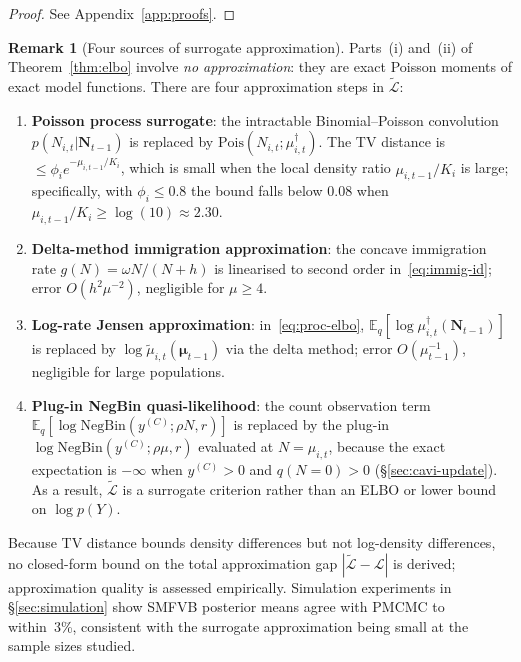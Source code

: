 \documentclass[review,12pt]{elsarticle}
\theoremstyle{definition}
\newtheorem{remark}{Remark}
\begin{document}
\begin{proof}
See Appendix~\ref{app:proofs}.
\end{proof}

\begin{remark}[Four sources of surrogate approximation]\label{rem:poi-approx}
Parts~(i) and~(ii) of Theorem~\ref{thm:elbo} involve \emph{no approximation}:
they are exact Poisson moments of exact model functions.  There are four
approximation steps in $\tilde{\mathcal{L}}$:
\begin{enumerate}[label=(\alph*)]
\item \textbf{Poisson process surrogate}: the intractable Binomial--Poisson
  convolution $p(N_{i,t}|\mathbf{N}_{t-1})$ is replaced by
  $\mathrm{Pois}(N_{i,t};\mu^\dagger_{i,t})$.  The TV distance is
  $\le\phi_i e^{-\mu_{i,t-1}/K_i}$, which is small when the local
  density ratio $\mu_{i,t-1}/K_i$ is large; specifically, with $\phi_i\le0.8$
  the bound falls below $0.08$ when $\mu_{i,t-1}/K_i\ge\log(10)\approx2.30$.
\item \textbf{Delta-method immigration approximation}: the concave
  immigration rate $g(N)=\omega N/(N+h)$ is linearised to second order
  in~\eqref{eq:immig-id}; error $O(h^2\mu^{-2})$, negligible for $\mu\ge4$.
\item \textbf{Log-rate Jensen approximation}: in~\eqref{eq:proc-elbo},
  $\mathbb{E}_q[\log\mu^\dagger_{i,t}(\mathbf{N}_{t-1})]$ is replaced by
  $\log\tilde\mu_{i,t}(\boldsymbol\mu_{t-1})$ via the delta method;
  error $O(\mu_{t-1}^{-1})$, negligible for large populations.
\item \textbf{Plug-in NegBin quasi-likelihood}: the count observation term
  $\mathbb{E}_q[\log\mathrm{NegBin}(y^{(C)};\rho N,r)]$ is replaced by the
  plug-in $\log\mathrm{NegBin}(y^{(C)};\rho\mu,r)$ evaluated at
  $N=\mu_{i,t}$, because the exact expectation is $-\infty$ when $y^{(C)}>0$
  and $q(N=0)>0$ (\S\ref{sec:cavi-update}).  As a result, $\tilde{\mathcal{L}}$
  is a surrogate criterion rather than an ELBO or lower bound on $\log p(Y)$.
\end{enumerate}
Because TV distance bounds density differences but not log-density differences,
no closed-form bound on the total approximation gap $|\tilde{\mathcal{L}}-\mathcal{L}|$
is derived; approximation quality is assessed empirically.  Simulation
experiments in \S\ref{sec:simulation} show SMFVB posterior means agree with
PMCMC to within~3\%, consistent with the surrogate approximation being small
at the sample sizes studied.
\end{remark}
\end{document}
